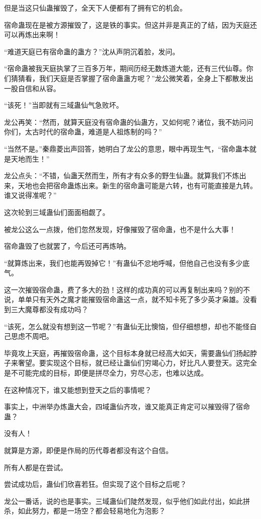 \begin{this_body}
但是当这只仙蛊摧毁了，全天下人便都有了拥有它的机会。

宿命蛊现在是被方源摧毁了，这是铁的事实。但这并非是真正的了结，因为天庭还可以再炼出来啊！

“难道天庭已有宿命蛊的蛊方？”沈从声阴沉着脸，发问。

“宿命蛊被我天庭执掌了三百多万年，期间历经无数炼道大能，还有三代仙尊。你们猜猜看，我们天庭是否掌握了宿命蛊蛊方呢？”龙公微笑着，全身上下都散发出一股自信和从容。

“该死！”当即就有三域蛊仙气急败坏。

龙公再笑：“然而，就算天庭没有宿命蛊的仙蛊方，又如何呢？诸位，我不妨问问你们，太古时代的宿命蛊，难道是人祖炼制的吗？”

“当然不是。”秦鼎菱出声回答，她明白了龙公的意思，眼中再现生气，“宿命蛊本就是天地而生！”

龙公点头：“不错，仙蛊天然而生，所有才有众多的野生仙蛊。就算我们不炼出来，天地也会把宿命蛊炼出来。新生的宿命蛊可能是六转，也有可能直接是九转。谁又说得准呢？”

这次轮到三域蛊仙们面面相觑了。

被龙公这么一点拨，他们忽然发现，好像摧毁了宿命蛊，也不是什么大事！

宿命蛊毁了也就罢了，今后还可再炼呐。

“就算炼出来，我们也能再毁掉它！”有蛊仙不忿地呼喊，但他自己也没有多少底气。

这一次摧毁宿命蛊，费了多大的劲！这样的成功真的可以再复制出来吗？别的不说，单单只有天外之魔才能摧毁宿命蛊这一点，就不知卡死了多少英才枭雄。没看到三大魔尊都没有成功吗？

“该死，怎么就没有想到这一节呢？”有蛊仙无比懊恼，但仔细想想，却也不能怪自己思虑不周吧。

毕竟攻上天庭，再摧毁宿命蛊，这个目标本身就已经高大如天，需要蛊仙们扬起脖子来奢望。要实现这个目标，就已经让蛊仙们穷竭心力，好比凡人要登天。这完全是不可能完成的目标，即便是拼尽全力，穷尽心志，也难以达成。

在这种情况下，谁又能想到登天之后的事情呢？

事实上，中洲举办炼蛊大会，四域蛊仙齐攻，谁又能真正肯定可以摧毁得了宿命蛊？

没有人！

就算是方源，即便是作局的历代尊者都没有这个自信。

所有人都是在尝试。

尝试成功后，蛊仙们欣喜若狂。但实现了这个目标之后呢？

龙公一番话，说的也是事实。三域蛊仙们陡然发现，似乎他们如此付出，如此拼杀，如此努力，都是一场空？都会轻易地化为泡影？


\end{this_body}
